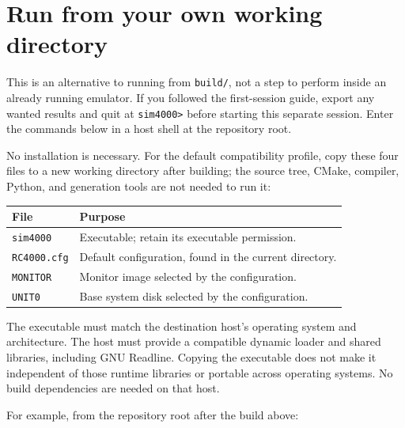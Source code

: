 \chapter{Run from your own working directory}\label{run-from-your-own-working-directory}

This is an alternative to running from \texttt{build/}, not a step to perform
inside an already running emulator. If you followed the first-session guide,
export any wanted results and quit at \texttt{sim4000>} before starting this
separate session. Enter the commands below in a host shell at the repository
root.

No installation is necessary. For the default compatibility profile, copy
these four files to a new working directory after building; the source tree,
CMake, compiler, Python, and generation tools are not needed to run it:

\begin{longtable}[]{@{}
  >{\raggedright\arraybackslash}p{}
  >{\raggedright\arraybackslash}p{}@{}}
\toprule\noalign{}
\begin{minipage}[b]{\linewidth}\raggedright
File
\end{minipage} & \begin{minipage}[b]{\linewidth}\raggedright
Purpose
\end{minipage} \\
\midrule\noalign{}
\endhead
\bottomrule\noalign{}
\endlastfoot
\passthrough{\lstinline!sim4000!} & Executable; retain its executable permission. \\
\passthrough{\lstinline!RC4000.cfg!} & Default configuration, found in the current directory. \\
\passthrough{\lstinline!MONITOR!} & Monitor image selected by the configuration. \\
\passthrough{\lstinline!UNIT0!} & Base system disk selected by the configuration. \\
\end{longtable}

The executable must match the destination host's operating system and architecture. The host must provide a compatible dynamic loader and shared libraries, including GNU Readline. Copying the executable does not make it independent of those runtime libraries or portable across operating systems. No build dependencies are needed on that host.

For example, from the repository root after the build above:

